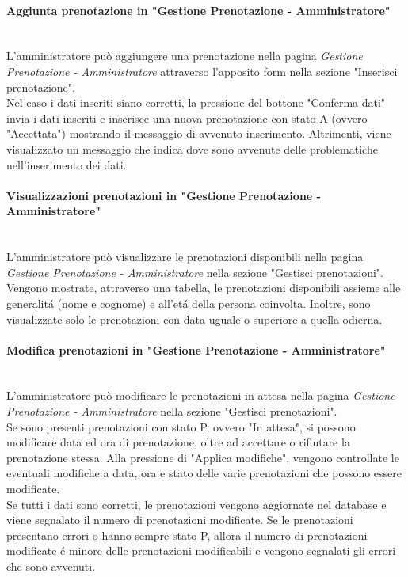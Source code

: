 \documentclass{article}
\begin{document}
\paragraph{Aggiunta prenotazione in "Gestione Prenotazione - Amministratore"}\mbox{}\\
L'amministratore può aggiungere una prenotazione nella pagina \textit{Gestione Prenotazione - Amministratore} attraverso l'apposito form nella sezione "Inserisci prenotazione".\\
Nel caso i dati inseriti siano corretti, la pressione del bottone "Conferma dati" invia i dati inseriti e inserisce una nuova prenotazione con stato A (ovvero "Accettata") mostrando il messaggio di avvenuto inserimento. Altrimenti, viene visualizzato un messaggio che indica dove sono avvenute delle problematiche nell'inserimento dei dati.

\paragraph{Visualizzazioni prenotazioni in "Gestione Prenotazione - Amministratore"}\mbox{}\\
L'amministratore può visualizzare le prenotazioni disponibili nella pagina \textit{Gestione Prenotazione - Amministratore} nella sezione "Gestisci prenotazioni".\\
Vengono mostrate, attraverso una tabella, le prenotazioni disponibili assieme alle generalitá (nome e cognome) e all'etá della persona coinvolta. Inoltre, sono visualizzate solo le prenotazioni con data uguale o superiore a quella odierna.

\paragraph{Modifica prenotazioni in "Gestione Prenotazione - Amministratore"}\mbox{}\\
L'amministratore può modificare le prenotazioni in attesa nella pagina \textit{Gestione Prenotazione - Amministratore} nella sezione "Gestisci prenotazioni".\\
Se sono presenti prenotazioni con stato P, ovvero "In attesa", si possono modificare data ed ora di prenotazione, oltre ad accettare o rifiutare la prenotazione stessa. Alla pressione di "Applica modifiche", vengono controllate le eventuali modifiche a data, ora e stato delle varie prenotazioni che possono essere modificate.\\
Se tutti i dati sono corretti, le prenotazioni vengono aggiornate nel database e viene segnalato il numero di prenotazioni modificate. Se le prenotazioni presentano errori o hanno sempre stato P, allora il numero di prenotazioni modificate é minore delle prenotazioni modificabili e vengono segnalati gli errori che sono avvenuti.
\end{document}
